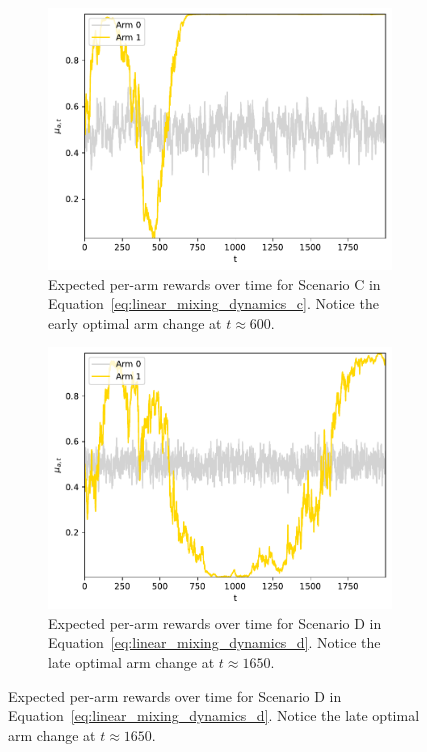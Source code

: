 \begin{figure}[!h]
	\begin{subfigure}[b]{0.45\textwidth}
		\includegraphics[width=\textwidth]{./fods_figs/dynamic/logistic/dynamics_c}
		\caption{Expected per-arm rewards over time for Scenario C in Equation~\eqref{eq:linear_mixing_dynamics_c}.
			Notice the early optimal arm change at $t\approx600$.
		}
		\label{fig:linear_mixing_dynamics_c_logistic}
	\end{subfigure}\qquad
	\begin{subfigure}[b]{0.45\textwidth}
		\includegraphics[width=\textwidth]{./fods_figs/dynamic/logistic/dynamics_d}
		\caption{Expected per-arm rewards over time for Scenario D in Equation~\eqref{eq:linear_mixing_dynamics_d}.
			Notice the late optimal arm change at $t\approx1650$.
		}
		\label{fig:linear_mixing_dynamics_d_logistic}
	\end{subfigure}
	

\end{figure}
